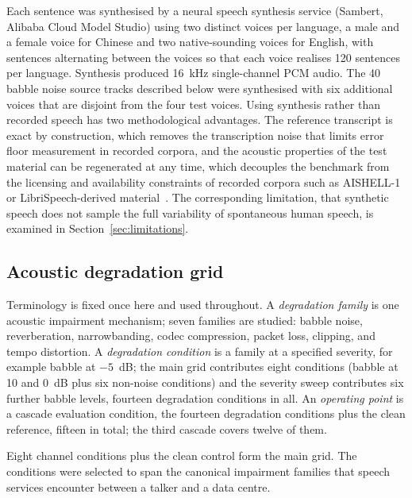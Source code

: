 Each sentence was synthesised by a neural speech synthesis service (Sambert,
Alibaba Cloud Model Studio) using two distinct voices per language, a male
and a female voice for Chinese and two native-sounding voices for English,
with sentences alternating between the voices so that each voice realises 120
sentences per language. Synthesis produced 16~kHz single-channel PCM audio.
The 40 babble noise source tracks described below were synthesised with
six additional voices that are disjoint from the four test voices. Using
synthesis rather than recorded speech has two methodological advantages. The
reference transcript is exact by construction, which removes the transcription
noise that limits error floor measurement in recorded corpora, and the
acoustic properties of the test material can be regenerated at any time,
which decouples the benchmark from the licensing and availability constraints
of recorded corpora such as AISHELL-1~\cite{bu2017aishell} or
LibriSpeech-derived material~\cite{zen2019libritts}. The corresponding
limitation, that synthetic speech does not sample the full variability of
spontaneous human speech, is examined in Section~\ref{sec:limitations}.

\subsection{Acoustic degradation grid}

Terminology is fixed once here and used throughout. A \emph{degradation
family} is one acoustic impairment mechanism; seven families are studied:
babble noise, reverberation, narrowbanding, codec compression, packet loss,
clipping, and tempo distortion. A \emph{degradation condition} is a family
at a specified severity, for example babble at $-5$~dB; the main grid
contributes eight conditions (babble at 10 and 0~dB plus six non-noise
conditions) and the severity sweep contributes six further babble levels,
fourteen degradation conditions in all. An \emph{operating point} is a
cascade evaluation condition, the fourteen degradation conditions plus the
clean reference, fifteen in total; the third cascade covers twelve of them.

Eight channel conditions plus the clean control form the main grid. The
conditions were selected to span the canonical impairment families that
speech services encounter between a talker and a data centre.


